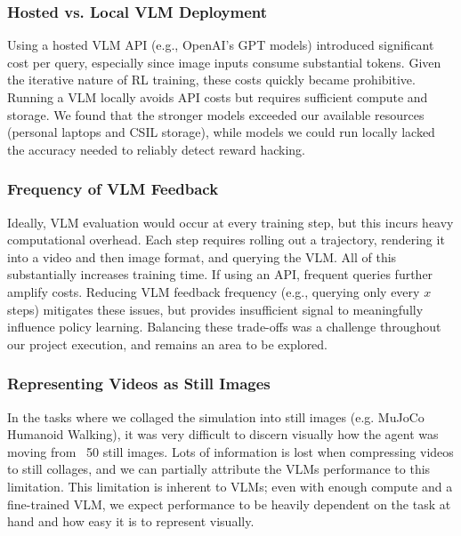 \documentclass{article}
\begin{document}
\subsubsection{Hosted vs. Local VLM Deployment}
Using a hosted VLM API (e.g., OpenAI's GPT models) introduced significant cost per query, especially since image inputs consume substantial tokens. Given the iterative nature of RL training, these costs quickly became prohibitive. Running a VLM locally avoids API costs but requires sufficient compute and storage. We found that the stronger models exceeded our available resources (personal laptops and CSIL storage), while models we could run locally lacked the accuracy needed to reliably detect reward hacking.

\subsubsection{Frequency of VLM Feedback}
Ideally, VLM evaluation would occur at every training step, but this incurs heavy computational overhead. Each step requires rolling out a trajectory, rendering it into a video and then image format, and querying the VLM. All of this substantially increases training time. If using an API, frequent queries further amplify costs. Reducing VLM feedback frequency (e.g., querying only every $x$ steps) mitigates these issues, but provides insufficient signal to meaningfully influence policy learning. Balancing these trade-offs was a challenge throughout our project execution, and remains an area to be explored.

\subsubsection{Representing Videos as Still Images}
In the tasks where we collaged the simulation into still images (e.g. MuJoCo Humanoid Walking), it was very difficult to discern visually how the agent was moving from ~50 still images. Lots of information is lost when compressing videos to still collages, and we can partially attribute the VLMs performance to this limitation. This limitation is inherent to VLMs; even with enough compute and a fine-trained VLM, we expect performance to be heavily dependent on the task at hand and how easy it is to represent visually. 
\end{document}
